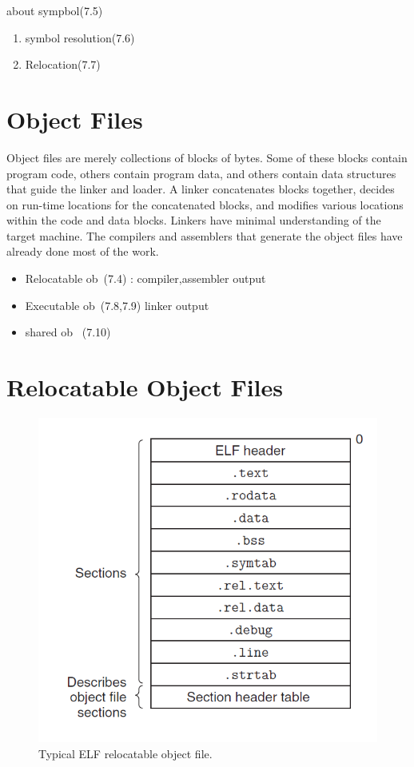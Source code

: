 about sympbol(7.5)
\begin{enumerate}
    \item symbol resolution(7.6)
    \item Relocation(7.7)
\end{enumerate}

\section{Object Files}

Object files are merely collections of blocks
of bytes. Some of these blocks contain program code, others contain program
data, and others contain data structures that guide the linker and loader. A linker
concatenates blocks together, decides on run-time locations for the concatenated
blocks, and modifies various locations within the code and data blocks. Linkers
have minimal understanding of the target machine. The compilers and assemblers
that generate the object files have already done most of the work.


\begin{itemize}
    \item Relocatable ob~(7.4) : compiler,assembler output
    \item Executable ob~(7.8,7.9) linker output
    \item shared ob~ (7.10)
\end{itemize}



\section{Relocatable Object Files}


\begin{figure}[h!]
    \centering
    \includegraphics[scale=0.5]{pic/section7/pic2.png}
    \caption{Typical ELF relocatable object file.}
\end{figure}

